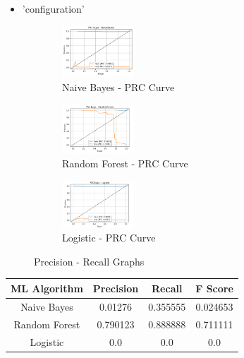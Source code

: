 \documentclass{seal_article}
\begin{document}
\begin{itemize}
\item  'configuration'
\end{itemize}

\vspace{0.5cm}
\begin{figure}[h] 
\centering
\captionsetup{justification=centering}
\begin{subfigure}{.3\linewidth}
  \centering
  \includegraphics[width=2.7cm]{img/naive_configurations.PNG}
  \caption{Naive Bayes - PRC Curve}
  \label{fig:sub1}
\end{subfigure}
\begin{subfigure}{.3\linewidth}
  \centering
  \includegraphics[width=2.7cm]{img/random_configuration.PNG}
  \caption{Random Forest - PRC Curve}
  \label{fig:sub1}
\end{subfigure}
\begin{subfigure}{.3\linewidth}
  \centering
  \includegraphics[width=2.7cm]{img/logistic_configuration.PNG}
  \caption{Logistic - PRC Curve}
  \label{fig:sub2}
\end{subfigure}
\caption{Precision - Recall Graphs}
\label{fig.aug}
\end{figure} 
\begin{center}
 \begin{tabular}{||c c c c||} 
 \hline
 ML Algorithm &Precision & Recall & F Score   \\ [0.5ex] 
 \hline\hline
  Naive Bayes & 0.01276 & 0.355555 & 0.024653\\ 
 \hline
 Random Forest &  0.790123 & 0.888888 & 0.711111 \\
 \hline
 Logistic & 0.0 & 0.0 & 0.0 \\
 \hline
\end{tabular}
\end{center}
\vspace{0.5cm}
\end{document}
